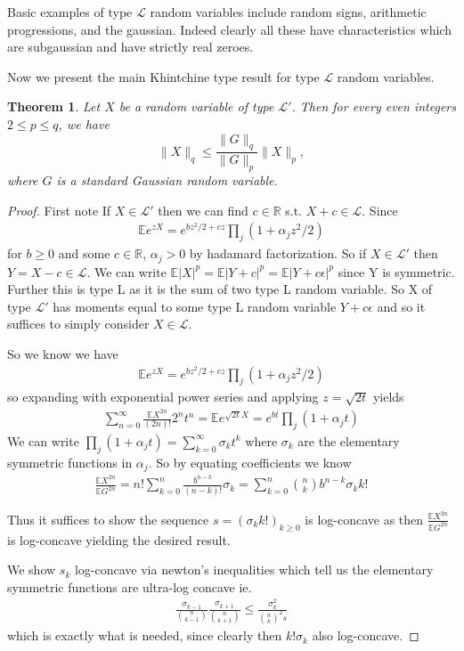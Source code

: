 \documentclass[10pt]{article}
\newcommand{\E}{\mathbb{E}}
\newcommand{\1}{\textbf{1}}
\newcommand{\R}{\mathbb{R}}
\newtheorem{theorem}{Theorem}
\theoremstyle{remark}
\theoremstyle{definition}
\begin{document}
Basic examples of type $\mathcal{L}$ random variables include random signs, arithmetic progressions, and the gaussian. Indeed clearly all these have characteristics which are subgaussian and have strictly real zeroes. 

Now we present the main Khintchine type result for type $\mathcal{L}$ random variables. 

\begin{theorem}
Let $X$ be a random variable of type $\mathcal{L}'$. Then for every even integers $2 \leq p \leq q$, we have
\begin{equation}
\|X\|_q \leq \frac{\|G\|_q}{\|G\|_p}\|X\|_p,
\end{equation}
where $G$ is a standard Gaussian random variable.
\end{theorem}

\begin{proof}
	First note If $X \in \mathcal{L}'$ then we can find $c \in \R$ s.t. $X+c \in \mathcal{L}$. Since
	\begin{align*}
		\E e^{zX} = e^{bz^2/2+cz}\prod_j(1+\alpha_jz^2/2)
	\end{align*}
	for $b \geq 0$ and some $c \in \R$, $\alpha_j > 0$ by hadamard factorization. So if $X \in \mathcal{L}'$ then $Y = X-c \in \mathcal{L}$. We can write $\E|X|^p = \E|Y+c|^p = \E|Y+c\epsilon|^p$ since Y is symmetric. Further this is type L as it is the sum of two type L random variable. So X of type $\mathcal{L}'$ has moments equal to some type L random variable $Y+c\epsilon$ and so it suffices to simply consider $X \in \mathcal{L}$.

	So we know we have
	\begin{align*}
		\E e^{zX} = e^{bz^2/2+cz}\prod_j(1+\alpha_jz^2/2)
	\end{align*}
	so expanding with exponential power series and applying $z = \sqrt{2t}$ yields
	\begin{align*}
		\sum_{n=0}^{\infty}\frac{\E X^{2n}}{(2n)!} 2^nt^n = \E e^{\sqrt{2t}X} = e^{bt}\prod_j(1+\alpha_j t)
	\end{align*}
	We can write $\prod_j(1+\alpha_j t) = \sum_{k=0}^{\infty}\sigma_k t^k$ where $\sigma_k$ are the elementary symmetric functions in $\alpha_j$. So by equating coefficients we know 
	\begin{align*}
		\frac{\E X^{2n}}{\E G^{2n}} = n!\sum_{k=0}^n \frac{b^{n-k}}{(n-k)!}\sigma_k = \sum_{k=0}^n {n \choose k}b^{n-k}\sigma_k k!
	\end{align*}

	Thus it suffices to show the sequence $s = (\sigma_k k!)_{k \geq 0}$ is log-concave as then $\frac{\E X^{2n}}{\E G^{2n}}$ is log-concave yielding the desired result. 

	We show $s_k$ log-concave via newton's inequalities which tell us the elementary symmetric functions are ultra-log concave ie.
	\begin{align*}
		\frac{\sigma_{k-1}}{{n \choose k-1}}\frac{\sigma_{k+1}}{{n \choose k+1}} \leq \frac{\sigma_{k}^2}{{n \choose k}^2s}
	\end{align*}
	which is exactly what is needed, since clearly then $k!\sigma_k$ also log-concave.
\end{proof}
\end{document}
